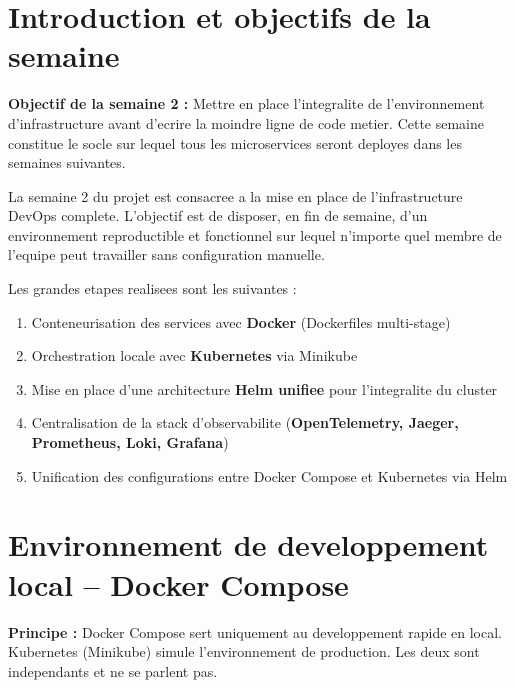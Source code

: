 \documentclass[12pt,a4paper]{article}
\begin{document}
\section{Introduction et objectifs de la semaine}

\begin{infobox}
\textbf{Objectif de la semaine 2 :} Mettre en place l'integralite de l'environnement
d'infrastructure avant d'ecrire la moindre ligne de code metier. Cette semaine constitue
le socle sur lequel tous les microservices seront deployes dans les semaines suivantes.
\end{infobox}

\vspace{0.5cm}

La semaine 2 du projet est consacree a la mise en place de l'infrastructure DevOps
complete. L'objectif est de disposer, en fin de semaine, d'un environnement reproductible
et fonctionnel sur lequel n'importe quel membre de l'equipe peut travailler sans
configuration manuelle.

Les grandes etapes realisees sont les suivantes :

\begin{enumerate}[leftmargin=*, label=\textbf{\arabic*.}]
  \item Conteneurisation des services avec \textbf{Docker} (Dockerfiles multi-stage)
  \item Orchestration locale avec \textbf{Kubernetes} via Minikube
  \item Mise en place d'une architecture \textbf{Helm unifiee} pour l'integralite du cluster
  \item Centralisation de la stack d'observabilite (\textbf{OpenTelemetry, Jaeger, Prometheus, Loki, Grafana})
  \item Unification des configurations entre Docker Compose et Kubernetes via Helm
\end{enumerate}

\section{Environnement de developpement local -- Docker Compose}

\begin{infobox}
\textbf{Principe :} Docker Compose sert uniquement au developpement rapide en local.
Kubernetes (Minikube) simule l'environnement de production. Les deux sont independants
et ne se parlent pas.
\end{infobox}
\end{document}
